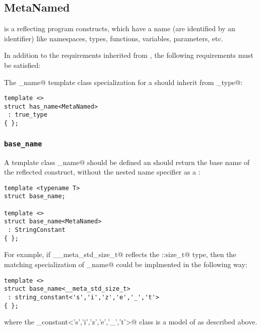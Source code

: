 \subsection{MetaNamed}
\label{concept-MetaNamed}


 is a  reflecting program constructs, which have a name
(are identified by an identifier) like namespaces, types, functions, variables, parameters, etc.

In addition to the requirements inherited from , the following requirements must
be satisfied:

The \verb@has_name@ template class specialization for a  should
inherit from \verb@true_type@:

\begin{lstlisting}
template <>
struct has_name<MetaNamed>
 : true_type
{ };
\end{lstlisting}

\subsubsection{\texttt{base\_name}}

A template class \verb@base_name@ should be defined an should return the base name
of the reflected construct, without the nested name specifier as a
:

\begin{lstlisting}
template <typename T>
struct base_name;

template <>
struct base_name<MetaNamed>
 : StringConstant
{ };
\end{lstlisting}

For example, if \verb@__meta_std_size_t@ reflects the \verb@std::size_t@ type,
then the matching specialization of \verb@base_name@ could be implmented in the following
way:

\begin{lstlisting}
template <>
struct base_name<__meta_std_size_t>
 : string_constant<'s','i','z','e','_','t'>
{ };
\end{lstlisting}

where the \verb@string_constant<'s','i','z','e','_','t'>@ class is a model
of  as described above.

